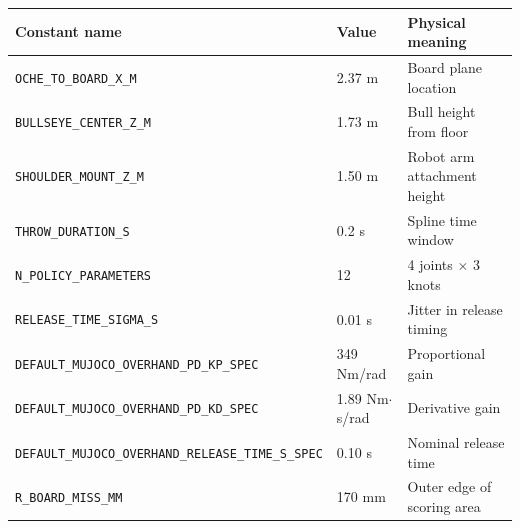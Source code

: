 \documentclass[11pt,letterpaper]{article}
\begin{document}
\begin{center}
\begin{tabular}{lll}
\toprule
Constant name & Value & Physical meaning \\
\midrule
\texttt{OCHE\_TO\_BOARD\_X\_M} & 2.37 m & Board plane location \\
\texttt{BULLSEYE\_CENTER\_Z\_M} & 1.73 m & Bull height from floor \\
\texttt{SHOULDER\_MOUNT\_Z\_M} & 1.50 m & Robot arm attachment height \\
\texttt{THROW\_DURATION\_S} & 0.2 s & Spline time window \\
\texttt{N\_POLICY\_PARAMETERS} & 12 & 4 joints $\times$ 3 knots \\
\texttt{RELEASE\_TIME\_SIGMA\_S} & 0.01 s & Jitter in release timing \\
\texttt{DEFAULT\_MUJOCO\_OVERHAND\_PD\_KP\_SPEC} & 349 Nm/rad & Proportional gain \\
\texttt{DEFAULT\_MUJOCO\_OVERHAND\_PD\_KD\_SPEC} & 1.89 Nm$\cdot$s/rad & Derivative gain \\
\texttt{DEFAULT\_MUJOCO\_OVERHAND\_RELEASE\_TIME\_S\_SPEC} & 0.10 s & Nominal release time \\
\texttt{R\_BOARD\_MISS\_MM} & 170 mm & Outer edge of scoring area \\
\bottomrule
\end{tabular}
\end{center}

\end{document}
